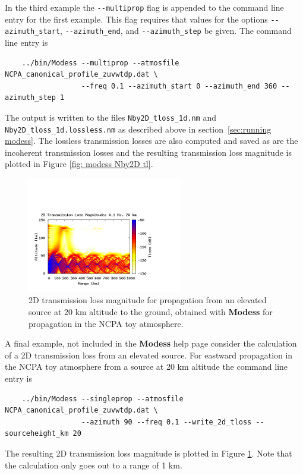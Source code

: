 In the third example the \verb+--multiprop+ flag is appended to the command line entry for the first example. This flag requires that values for the options \verb+--azimuth_start+, \verb+--azimuth_end+, and \verb+--azimuth_step+ be given. The command line entry is 
\begin{verbatim} 
    ../bin/Modess --multiprop --atmosfile NCPA_canonical_profile_zuvwtdp.dat \
                  --freq 0.1 --azimuth_start 0 --azimuth_end 360 --azimuth_step 1
\end{verbatim}
The output is written to the files \verb+Nby2D_tloss_1d.nm+ and \verb+Nby2D_tloss_1d.lossless.nm+ as described above in section~\ref{sec:running modess}. The lossless transmission losses are also computed and saved as are the incoherent transmission losses and the resulting transmission loss magnitude is plotted in Figure \ref{fig: modess Nby2D tl}. 
\begin{figure}
\begin{center}
\includegraphics[width=0.6\textwidth]{figs/modess_ex2_20km_source}
\end{center}
\caption{2D transmission loss magnitude for propagation from an elevated source at 20 km altitude to the ground, obtained with {\bf Modess} for propagation in the NCPA toy atmosphere.}
\label{fig: modess 2D elevated source}
\end{figure}
A final example, not included in the \textbf{Modess} help page consider the calculation of a 2D transmission loss from an elevated source. For eastward propagation in the NCPA toy atmosphere from a source at 20 km altitude the command line entry is 
\begin{verbatim} 
    ../bin/Modess --singleprop --atmosfile NCPA_canonical_profile_zuvwtdp.dat \ 
                  --azimuth 90 --freq 0.1 --write_2d_tloss --sourceheight_km 20
\end{verbatim}
The resulting 2D transmission loss magnitude is plotted in Figure \ref{fig: modess 2D elevated source}. Note that the calculation only goes out to a range of 1 km. 
